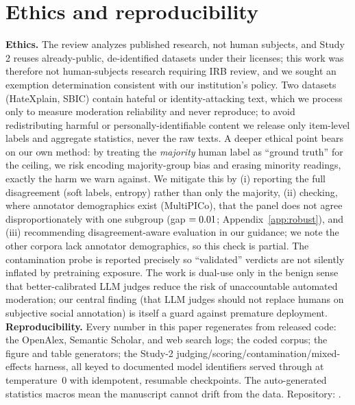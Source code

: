 \section{Ethics and reproducibility}
\textbf{Ethics.} The review analyzes published research, not human subjects, and Study 2 reuses already-public,
de-identified datasets under their licenses; this work was therefore not human-subjects research requiring IRB
review, and we sought an exemption determination consistent with our institution's policy. Two datasets (HateXplain,
SBIC) contain hateful or identity-attacking text, which we process only to measure moderation reliability and never
reproduce; to avoid redistributing harmful or personally-identifiable content we release only item-level labels and
aggregate statistics, never the raw texts. A deeper ethical point bears on our own method: by treating the
\emph{majority} human label as ``ground truth'' for the ceiling, we risk encoding majority-group bias and erasing
minority readings, exactly the harm we warn against. We mitigate this by (i) reporting the full disagreement (soft
labels, entropy) rather than only the majority, (ii) checking, where annotator demographics exist (MultiPICo), that
the panel does not agree disproportionately with one subgroup (gap $=0.01$; Appendix~\ref{app:robust}), and
(iii) recommending disagreement-aware evaluation in our guidance; we note the other corpora lack annotator
demographics, so this check is partial. The contamination probe is reported precisely so ``validated'' verdicts are
not silently inflated by pretraining exposure. The work is dual-use only in the benign sense that better-calibrated
LLM judges reduce the risk of unaccountable automated moderation; our central finding (that LLM judges should not replace humans on subjective social annotation) is itself a guard against premature deployment.
\textbf{Reproducibility.} Every number in this paper regenerates from released code: the OpenAlex, Semantic Scholar,
and web search logs; the coded corpus; the figure and table generators; the Study-2 judging/scoring/contamination/mixed-effects harness, all keyed to documented model identifiers served through
\PROVIDER{} at temperature~$0$ with idempotent, resumable checkpoints. The auto-generated statistics macros
mean the manuscript cannot drift from the data. Repository: \REPO{}.

